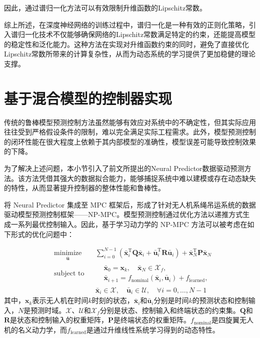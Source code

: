 \documentclass[lang=chs, degree=master, blindreview=true, winfonts=true]{yanputhesis}
\begin{document}
	因此，通过谱归一化方法可以有效限制升维函数的Lipschitz常数。

综上所述，在深度神经网络的训练过程中，谱归一化是一种有效的正则化策略，引入谱归一化技术不仅能够确保网络的Lipschitz常数满足特定的约束，还能提高模型的稳定性和泛化能力。这种方法在实现对升维函数约束的同时，避免了直接优化Lipschitz常数所带来的计算复杂性，从而为动态系统的学习提供了更加稳健的理论支撑。

\section{基于混合模型的控制器实现}

传统的鲁棒模型预测控制方法虽然能够有效应对系统中的不确定性，但其实际应用往往受到严格假设条件的限制，难以完全满足实际工程需求。此外，模型预测控制的闭环性能在很大程度上依赖于其内部模型的准确性，模型误差可能导致控制效果的下降。

为了解决上述问题，本小节引入了前文所提出的Neural Predictor数据驱动预测方法。该方法凭借其强大的数据拟合能力，能够捕捉系统中难以建模或存在动态缺失的特性，从而显著提升控制器的整体性能和鲁棒性。

将 Neural Predictor 集成至 MPC 框架后，形成了针对无人机系绳吊运系统的数据驱动模型预测控制框架——NP-MPC。模型预测控制通过优化方法以递推方式生成一系列最优控制输入。因此，基于学习动力学的 NP-MPC 方法可以被考虑在如下形式的优化问题中：

\begin{equation}
	\begin{aligned} \label{nmpc}
		&\operatorname*{minimize}_{\bm{\bar{u}}}& & \sum_{i=0}^{N-1}\left(\bm{\bar{x}}_i^\mathrm{T}\bm{Q}\bm{\bar{x}}_i + \bm{\bar{u}}_i^\mathrm{T}\bm{R}\bm{\bar{u}}_i\right) + \bm{\bar{x}}_N^\mathrm{T}\bm{P}\bm{\bar{x}}_N  \\
		&\text{subject to}& & \begin{aligned}
			&\bm{\bar{x}}_{0} = \bm{x}_k, \quad \bm{\bar{x}}_{N} \in \mathcal{X}_f, \\
			&\bm{\bar{x}}_{i+1} = {f}_{\text{nominal}}(\bm{\bar{x}}_i, \bm{\bar{u}}_i) + {f}_{\text{learned}},
		\end{aligned} \\
		&&& \bm{\bar{x}}_i \in \mathcal{X}, \quad \bm{\bar{u}}_i \in \mathcal{U}, \quad \forall i = 0, \ldots, N-1
	\end{aligned}
\end{equation}
其中，$\bm{x}_k$表示无人机在时间$k$时刻的状态，$\bm{\bar{x}}_i$和$\bm{\bar{u}}_i$分别是时间$k$的预测状态和控制输入，$N$是预测时域。$\mathcal{X}$、$\mathcal{U}$和$\mathcal{X}_f$分别是状态、控制输入和终端状态的约束集。$\bm{Q}$和$\bm{R}$是状态和控制输入的权重矩阵，$\bm{P}$是终端状态的权重矩阵。${f}_{\text{nominal}}$是四旋翼无人机的名义动力学，而${f}_{\text{learned}}$是通过升维线性系统学习得到的动态特性。
\end{document}
